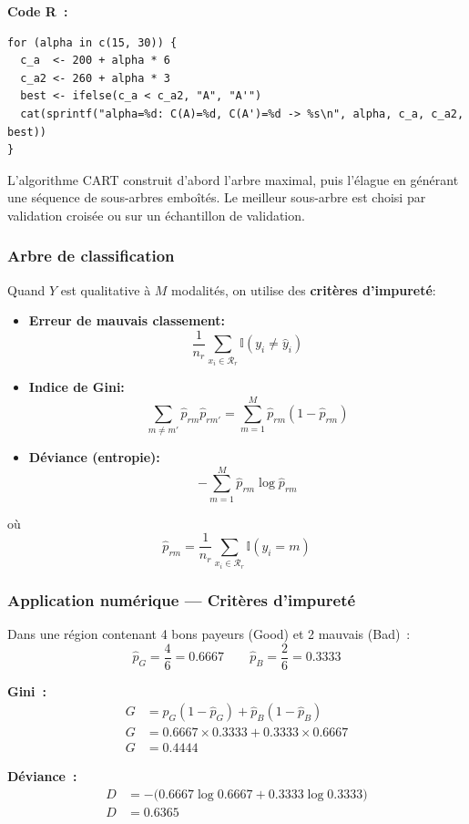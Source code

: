 \documentclass[a4paper,12pt]{article}
\begin{document}
\noindent\textbf{Code R~:}
\begin{lstlisting}[]
for (alpha in c(15, 30)) {
  c_a  <- 200 + alpha * 6
  c_a2 <- 260 + alpha * 3
  best <- ifelse(c_a < c_a2, "A", "A'")
  cat(sprintf("alpha=%d: C(A)=%d, C(A')=%d -> %s\n", alpha, c_a, c_a2, best))
}
\end{lstlisting}
\newpage

L'algorithme CART construit d'abord l'arbre maximal, puis l'élague en générant une séquence de sous-arbres emboîtés. Le meilleur sous-arbre est choisi par validation croisée ou sur un échantillon de validation.

\subsubsection{Arbre de classification}
Quand $Y$ est qualitative à $M$ modalités, on utilise des \textbf{critères d'impureté}:

\begin{itemize}
  \item \textbf{Erreur de mauvais classement:} \[\dfrac{1}{n_r} \sum_{x_i \in \mathcal{R}_r} \mathbb{I}(y_i \neq \hat{y}_i)\]
  \item \textbf{Indice de Gini:} \[\sum_{m \neq m'} \hat{p}_{rm} \hat{p}_{rm'} = \sum_{m=1}^{M} \hat{p}_{rm} (1 - \hat{p}_{rm})\]
  \item \textbf{Déviance (entropie):} \[-\sum_{m=1}^{M} \hat{p}_{rm} \log \hat{p}_{rm}\]
\end{itemize}
où \[\hat{p}_{rm} = \frac{1}{n_r} \sum_{x_i \in \mathcal{R}_r} \mathbb{I}(y_i = m)\]

\subsubsection*{Application numérique — Critères d'impureté}
Dans une région contenant 4 bons payeurs (Good) et 2 mauvais (Bad)~:
\[
\hat{p}_{G} = \frac{4}{6} = 0.6667 \qquad \hat{p}_{B} = \frac{2}{6} = 0.3333
\]

\noindent\textbf{Gini~:}
\begin{align*}
  G &= \hat{p}_{G}(1-\hat{p}_{G}) + \hat{p}_{B}(1-\hat{p}_{B}) \\
  G &= 0.6667\times0.3333 + 0.3333\times0.6667 \\
  G &= 0.4444
\end{align*}  

\noindent\textbf{Déviance~:}
\begin{align*}
  D &= -\bigl(0.6667\log0.6667 + 0.3333\log0.3333\bigr) \\
  D &= 0.6365
\end{align*}
\end{document}
